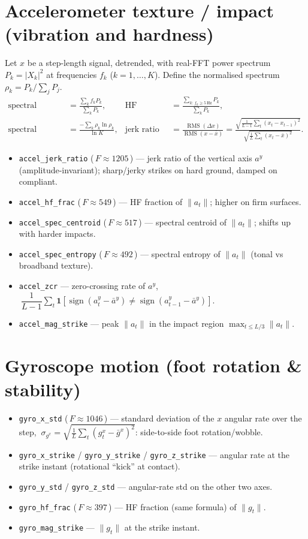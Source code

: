 \documentclass[11pt]{article}
\newcommand{\code}[1]{\texttt{#1}}
\newcommand{\Fval}[1]{{\small(\,$F\!\approx\!#1$\,)}}
\begin{document}
\section{Accelerometer texture / impact (vibration and hardness)}
Let $x$ be a step-length signal, detrended, with real-FFT power spectrum $P_k=\lvert X_k\rvert^2$ at
frequencies $f_k$ ($k=1,\dots,K$). Define the normalised spectrum $\rho_k=P_k/\sum_j P_j$.
\begin{align}
\text{spectral centroid} &= \frac{\sum_k f_k P_k}{\sum_k P_k}, &
\text{HF fraction} &= \frac{\sum_{k:\,f_k\ge 5\,\text{Hz}} P_k}{\sum_k P_k}, \\[2pt]
\text{spectral entropy} &= \frac{-\sum_k \rho_k\ln\rho_k}{\ln K}, &
\text{jerk ratio} &= \frac{\operatorname{RMS}(\Delta x)}{\operatorname{RMS}(x-\bar x)}
 = \frac{\sqrt{\tfrac1{L-1}\sum_t(x_t-x_{t-1})^2}}{\sqrt{\tfrac1L\sum_t(x_t-\bar x)^2}}.
\end{align}
\begin{itemize}
  \item \code{accel_jerk_ratio} \Fval{1205} --- jerk ratio of the vertical axis $a^y$
  (amplitude-invariant); sharp/jerky strikes on hard ground, damped on compliant.
  \item \code{accel_hf_frac} \Fval{549} --- HF fraction of $\lVert a_t\rVert$; higher on firm surfaces.
  \item \code{accel_spec_centroid} \Fval{517} --- spectral centroid of $\lVert a_t\rVert$; shifts up
  with harder impacts.
  \item \code{accel_spec_entropy} \Fval{492} --- spectral entropy of $\lVert a_t\rVert$ (tonal vs
  broadband texture).
  \item \code{accel_zcr} --- zero-crossing rate of $a^y$,
  $\ \dfrac{1}{L-1}\sum_{t}\mathbf 1\!\left[\operatorname{sign}(a^y_t-\bar a^y)\neq
  \operatorname{sign}(a^y_{t-1}-\bar a^y)\right]$.
  \item \code{accel_mag_strike} --- peak $\lVert a_t\rVert$ in the impact region
  $\max_{t\le L/3}\lVert a_t\rVert$.
\end{itemize}

\section{Gyroscope motion (foot rotation \& stability)}
\begin{itemize}
  \item \code{gyro_x_std} \Fval{1046} --- standard deviation of the $x$ angular rate over the step,
  $\ \sigma_{g^x}=\sqrt{\tfrac1L\sum_t (g^x_t-\bar g^x)^2}$: side-to-side foot rotation/wobble.
  \item \code{gyro_x_strike} / \code{gyro_y_strike} / \code{gyro_z_strike} --- angular rate at the
  strike instant (rotational ``kick'' at contact).
  \item \code{gyro_y_std} / \code{gyro_z_std} --- angular-rate std on the other two axes.
  \item \code{gyro_hf_frac} \Fval{397} --- HF fraction (same formula) of $\lVert g_t\rVert$.
  \item \code{gyro_mag_strike} --- $\lVert g_t\rVert$ at the strike instant.
\end{itemize}
\end{document}
